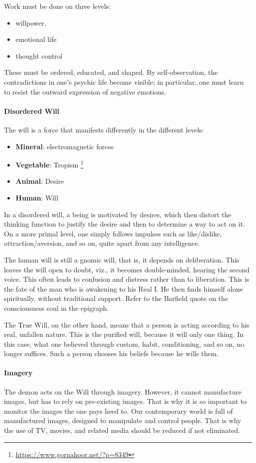 Work must be done on three levels:

\begin{itemize}
\item willpower, 
\item emotional life 
\item thought control 
\end{itemize}
These must be ordered, educated, and shaped. By self-observation, the contradictions in one's psychic life become visible; in particular, one must learn to resist the outward expression of negative emotions.

\paragraph{Disordered Will}
The will is a force that manifests differently in the different levels:

\begin{itemize}
\item \textbf{Mineral}: electromagnetic forces 
\item \textbf{Vegetable}: Tropism \footnote{\url{https://www.gornahoor.net/?p=8349}}
\item \textbf{Animal}: Desire 
\item \textbf{Human}: Will 
\end{itemize}
In a disordered will, a being is motivated by desires, which then distort the thinking function to justify the desire and then to determine a way to act on it. On a more primal level, one simply follows impulses such as like/dislike, attraction/aversion, and so on, quite apart from any intelligence.

The human will is still a gnomic will, that is, it depends on deliberation. This leaves the will open to doubt, viz., it becomes double-minded, hearing the second voice. This often leads to confusion and distress rather than to liberation. This is the fate of the man who is awakening to his Real I. He then finds himself alone spiritually, without traditional support. Refer to the Barfield quote on the consciousness soul in the epigraph.

The True Will, on the other hand, means that a person is acting according to his real, unfallen nature. This is the purified will, because it will only one thing. In this case, what one believed through custom, habit, conditioning, and so on, no longer suffices. Such a person chooses his beliefs because he wills them.

\paragraph{Imagery}
The demon acts on the Will through imagery. However, it cannot manufacture images, but has to rely on pre-existing images. That is why it is so important to monitor the images the one pays heed to. Our contemporary world is full of manufactured images, designed to manipulate and control people. That is why the use of TV, movies, and related media should be reduced if not eliminated.

